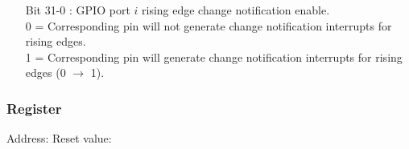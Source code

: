 \vspace{-2mm}
\begin{itemize}[leftmargin=18mm,labelsep=3mm,parsep=1.5mm]
    \item[\footnotesize Bit 31-0] : GPIO port $i$ rising edge change notification enable.\\{\footnotesize
    0 = Corresponding pin will not generate change notification interrupts for rising edges.\\
    1 = Corresponding pin will generate change notification interrupts for rising edges (0 $\rightarrow$ 1).}
\end{itemize}

\newpage
\subsubsection{ Register}
\vspace{-3mm}
Address: \hfill
Reset value: \\[-1mm]
